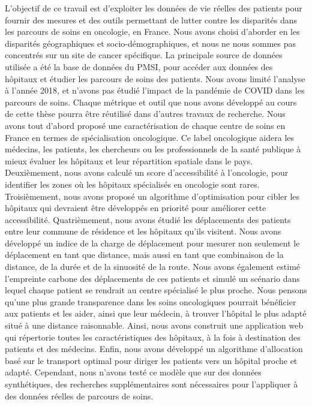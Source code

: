 L'objectif de ce travail est d'exploiter les données de vie réelles des patients
pour fournir des mesures et des outils permettant de lutter contre les
disparités dans les parcours de soins en oncologie, en France. Nous avons choisi
d'aborder en les disparités géographiques et socio-démographiques, et nous ne
nous sommes pas concentrés sur un site de cancer spécifique. La principale
source de données utilisée a été la base de données du PMSI, pour accéder aux
données des hôpitaux et étudier les parcours de soins des patients. Nous avons
limité l'analyse à l'année 2018, et n'avons pas étudié l'impact de la pandémie
de COVID dans les parcours de soins. Chaque métrique et outil que nous avons
développé au cours de cette thèse pourra être réutilisé dans d'autres travaux de
recherche. Nous avons tout d'abord proposé une caractérisation de chaque centre
de soins en France en termes de spécialisation oncologique. Ce label oncologique
aidera les médecins, les patients, les chercheurs ou les professionnels de la
santé publique à mieux évaluer les hôpitaux et leur répartition spatiale dans le
pays. Deuxièmement, nous avons calculé un score d'accessibilité à l'oncologie,
pour identifier les zones où les hôpitaux spécialisés en oncologie sont rares.
Troisièmement, nous avons proposé un algorithme d'optimisation pour cibler les
hôpitaux qui devraient être développés en priorité pour améliorer cette
accessibilité. Quatrièmement, nous avons étudié les déplacements des patients
entre leur commune de résidence et les hôpitaux qu'ils visitent. Nous avons
développé un indice de la charge de déplacement pour mesurer non seulement le
déplacement en tant que distance, mais aussi en tant que combinaison de la
distance, de la durée et de la sinuosité de la route. Nous avons également
estimé l'empreinte carbone des déplacements de ces patients et simulé un
scénario dans lequel chaque patient se rendrait au centre spécialisé le plus
proche. Nous pensons qu'une plus grande transparence dans les soins oncologiques
pourrait bénéficier aux patients et les aider, ainsi que leur médecin, à trouver
l'hôpital le plus adapté situé à une distance raisonnable. Ainsi, nous avons
construit une application web qui répertorie toutes les caractéristiques des
hôpitaux, à la fois à destination des patients et des médecins. Enfin, nous
avons développé un algorithme d'allocation basé sur le transport optimal pour
diriger les patients vers un hôpital proche et adapté. Cependant, nous n'avons
testé ce modèle que sur des données synthétiques, des recherches supplémentaires
sont nécessaires pour l'appliquer à des données réelles de parcours de soins.
